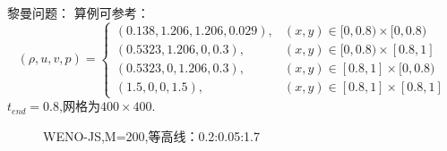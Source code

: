 \documentclass{book}
\begin{document}
\begin{example}{}{}黎曼问题：
    算例可参考：\cite{RN114}
    \begin{equation}
        (\rho, u, v, p)=\begin{cases}
            (0.138,1.206,1.206,0.029), & (x, y) \in[0,0.8) \times[0,0.8) \\
            (0.5323,1.206,0,0.3),      & (x, y) \in[0,0.8) \times[0.8,1] \\
            (0.5323,0,1.206,0.3),      & (x, y) \in[0.8,1] \times[0,0.8) \\
            (1.5,0,0,1.5),             & (x, y) \in[0.8,1] \times[0.8,1]
        \end{cases}
    \end{equation}
    $t_{end}=0.8$,网格为$400\times400$.

    \begin{figure}[H]%
        \centering
        \quad
        \caption{WENO-JS,M=200,等高线：0.2:0.05:1.7}
    \end{figure}
\end{example}
\end{document}
